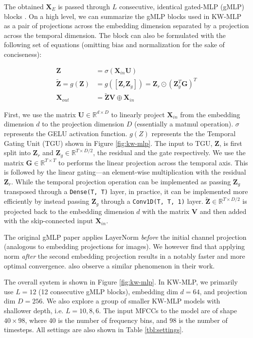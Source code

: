\documentclass{article} \usepackage{iclr2022_conference,times}
\def\mG{{\bm{G}}}
\def\mU{{\bm{U}}}
\def\mV{{\bm{V}}}
\def\mX{{\bm{X}}}
\def\mZ{{\bm{Z}}}
\newcommand{\R}{\mathbb{R}}
\begin{document}
The obtained $\mX_{E}$ is passed through $L$ consecutive, identical gated-MLP (gMLP) blocks \citep{liu2021pay}. On a high level, we can summarize the gMLP blocks used in KW-MLP as a pair of projections across the embedding dimension separated by a projection across the temporal dimension. The block can also be formulated with the following set of equations (omitting bias and normalization for the sake of conciseness):

\begin{equation}
\begin{split}
\mZ  & =  \sigma (\mX_{in} \mU) \\
\tilde \mZ  =  g(\mZ) & = g([\mZ_{r} \mZ_{g}]) = \mZ_{r} \odot (\mZ_{g}^{T}\mG)^{T}  \\
\mX_{out}  & = \tilde \mZ\mV \oplus \mX_{in}
\end{split}
\label{eqn:gmlp}
\end{equation}


First, we use the matrix $\mU \in \R^{d\times{D}}$ to linearly project $\mX_{in}$ from the embedding dimension $d$ to the projection dimension $D$ (essentially a matmul operation). $\sigma$ represents the GELU activation function. $g(Z)$ represents the the Temporal Gating Unit (TGU) shown in Figure \ref{fig:kw-mlp}. The input to TGU, $\mZ$, is first split into $\mZ_{r}$ and $\mZ_{g} \in \R^{T\times{D/2}}$, the residual and the gate respectively. We use the matrix $\mG \in \R^{T\times{T}}$ to performs the linear projection across the temporal axis. This is followed by the linear gating---an element-wise multiplication with the residual $\mZ_{r}$. While the temporal projection operation can be implemented as passing $\mZ_{g}$ transposed through a \texttt{Dense(T, T)} layer, in practice, it can be implemented more efficiently by instead passing $\mZ_{g}$ through a \texttt{Conv1D(T, T, 1)} layer. $\tilde \mZ \in \R^{T\times{D/2}}$ is projected back to the embedding dimension $d$ with the matrix $\mV$ and then added with the skip-connected input $\mX_{in}$.

The original gMLP paper \citep{liu2021pay} applies LayerNorm \textit{before} the initial channel projection (analogous to embedding projections for images). We however find that applying norm \textit{after} the second embedding projection results in a notably faster and more optimal convergence. \citet{berg21_interspeech} also observe a similar phenomenon in their work.

The overall system is shown in Figure \ref{fig:kw-mlp}. In KW-MLP, we primarily use $L = 12$ (12 consecutive gMLP blocks), embedding dim $d = 64$, and projection dim $D = 256$. We also explore a group of smaller KW-MLP models with shallower depth, i.e. $L = 10, 8, 6$. The input MFCCs to the model are of shape $40\times98$, where 40 is the number of frequency bins, and 98 is the number of timesteps. All settings are also shown in Table \ref{tbl:settings}.
\end{document}
